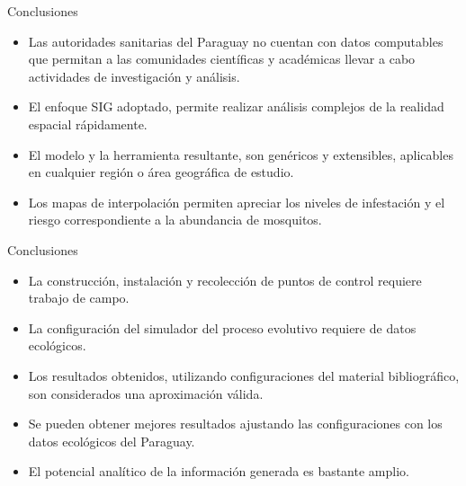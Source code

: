 \begin{frame}[t]{Conclusiones}
    \begin{itemize}
        \item Las autoridades sanitarias del Paraguay no cuentan con datos computables que permitan a las comunidades científicas y académicas llevar a cabo actividades de investigación y análisis.

        \item El enfoque SIG adoptado, permite realizar análisis complejos de la realidad espacial rápidamente.


        \item El modelo y la herramienta resultante, son genéricos y extensibles, aplicables en cualquier región o área geográfica de estudio.

        \item Los mapas de interpolación permiten apreciar los niveles de infestación y el riesgo correspondiente a la abundancia de mosquitos.

    \end{itemize}
\end{frame}

\begin{frame}[t]{Conclusiones}
    \begin{itemize}

        \item La construcción, instalación y recolección de puntos de control requiere trabajo de campo.

        \item La configuración del simulador del proceso evolutivo requiere de datos ecológicos.

        \item Los resultados obtenidos, utilizando configuraciones del material bibliográfico, son considerados una aproximación válida.

        \item Se pueden obtener mejores resultados ajustando las configuraciones con los datos ecológicos del Paraguay.

        \item El potencial analítico de la información generada es bastante amplio.
    \end{itemize}
\end{frame}
